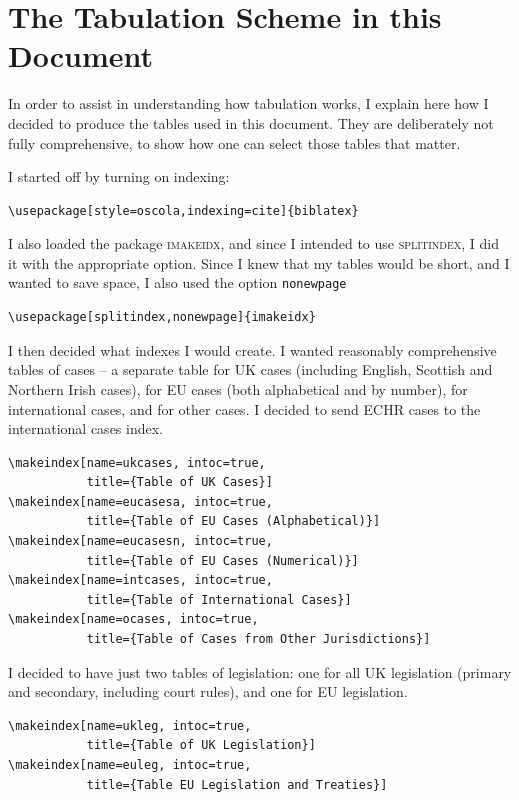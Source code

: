 \documentclass[a4paper,
               11pt,
	       DIV=1,			   
	       footinclude=false]
	      {scrartcl}
\begin{document}
\section{The Tabulation Scheme in this Document}

In order to assist in understanding how tabulation works, I explain here how I decided to produce the tables used in this document. They are deliberately not fully comprehensive, to show how one can select those tables that matter.

I started off by turning on indexing:

\begin{verbatim}
\usepackage[style=oscola,indexing=cite]{biblatex}
\end{verbatim}

I also loaded the package \textsc{imakeidx}, and since I intended to use \textsc{splitindex}, I did it with the appropriate option. Since I knew that my tables would be short, and I wanted to save space, I also used the option \verb|nonewpage|

\begin{verbatim}
\usepackage[splitindex,nonewpage]{imakeidx}
\end{verbatim}

I then decided what indexes I would create. I wanted reasonably comprehensive tables of cases -- a separate table for UK cases (including English, Scottish and Northern Irish cases), for EU cases (both alphabetical and by number), for international cases, and for other cases. I decided to send ECHR cases to the international cases index.

\begin{verbatim}
\makeindex[name=ukcases, intoc=true,
           title={Table of UK Cases}]
\makeindex[name=eucasesa, intoc=true,
           title={Table of EU Cases (Alphabetical)}]
\makeindex[name=eucasesn, intoc=true,
           title={Table of EU Cases (Numerical)}]
\makeindex[name=intcases, intoc=true,
           title={Table of International Cases}]
\makeindex[name=ocases, intoc=true,
           title={Table of Cases from Other Jurisdictions}]
\end{verbatim}

I decided to have just two tables of legislation: one for all UK legislation (primary and secondary, including court rules), and one for EU legislation.

\begin{verbatim}
\makeindex[name=ukleg, intoc=true,
           title={Table of UK Legislation}]
\makeindex[name=euleg, intoc=true,
           title={Table EU Legislation and Treaties}]
\end{verbatim}
\end{document}
